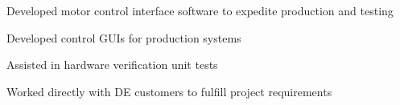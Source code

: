 \documentclass[]{deedy-resume-andrewvanhorn}
\begin{document}
\begin{minipage}[t]{0.66\textwidth} 

\sectionsep
\sectionsep
\sectionsep
\sectionsep
\section{}

\vspace{\topsep} %
\begin{tightemize}
	\item Developed motor control interface software to expedite production and testing
	\item Developed control GUIs for production systems
	\item Assisted in hardware verification unit tests
	\item Worked directly with DE customers to fulfill project requirements
\end{tightemize}
\sectionsep


\end{minipage}
\end{document}
